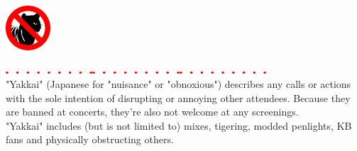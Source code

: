 \begin{changemargin}{1cm}{1cm}
\includegraphics[width=1.66cm,keepaspectratio]{images/no_yakkai.pdf}%
\vspace{-2.5em}
\begin{changemargin}{2cm}{0cm}
\hspace{0.5mm}\includegraphics[height=1mm,keepaspectratio]{images/dots_red.pdf}\hspace{3mm}\includegraphics[height=1mm,keepaspectratio]{images/dots_red.pdf}\hspace{3mm}\includegraphics[trim={0 0 9mm 0},clip,height=1mm,keepaspectratio]{images/dots_red.pdf}\\
\small "Yakkai" (Japanese for "nuisance" or "obnoxious") describes any calls or actions with the sole intention of disrupting or annoying other attendees. Because they are banned at concerts, they're also not welcome at any screenings.\\
{\footnotesize "Yakkai" includes (but is not limited to) mixes, tigering, modded penlights, KB fans and physically obstructing others.}
\end{changemargin}
\end{changemargin}

\vspace*{\fill}

\ifdefined\COMPLETE
\else
	
\fi